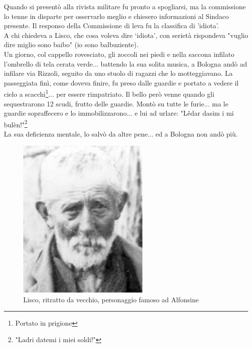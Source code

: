 Quando si presentò alla rivista militare fu pronto a spogliarsi, ma la commissione lo tenne in disparte per osservarlo meglio e chiesero informazioni al Sindaco presente. Il responso della Commissione di leva fu la classifica di 'idiota'.\\
A chi chiedeva a Lisco, che cosa voleva dire ‘idiota', con serietà rispondeva "vuglio dire miglio sono baibo" (io sono balbuziente).\\
Un giorno, col cappello rovesciato, gli zoccoli nei piedi e nella saccona infilato l'ombrello di tela cerata verde... battendo la sua solita musica, a Bologna andò ad infilare via Rizzoli, seguito da uno stuolo di ragazzi che lo motteggiavano. La passeggiata finì, come doveva finire, fu preso dalle guardie e portato a vedere il cielo a scacchi\footnote{Portato in prigione}... per essere rimpatriato. Il bello però venne quando gli sequestrarono 12 scudi, frutto delle guardie. Montò su tutte le furie... ma le guardie sopraffecero e lo immobilizzarono... e lui ad urlare: "Lêdar dasim i mi bulèn!"\footnote{"Ladri datemi i miei soldi!"}\\
La sua deficienza mentale, lo salvò da altre pene... ed a Bologna non andò più.\\

 \begin{figure}[htb]
    \centering
    \includegraphics[height=8cm]{Lisco}
    \caption*{Lisco, ritratto da vecchio, personaggio famoso ad Alfonsine\label{fig:Lisco}}
\end{figure}




